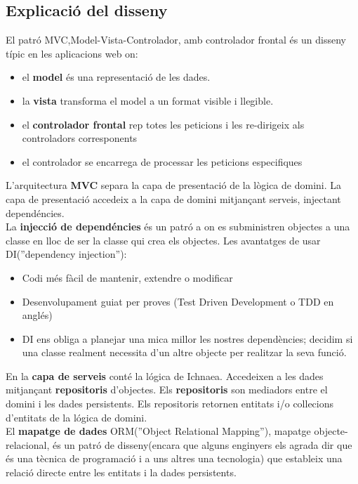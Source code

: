 \subsection{Explicaci\'{o} del disseny}
El patró MVC,Model-Vista-Controlador, amb controlador frontal \'{e}s un disseny t\'{i}pic en les aplicacions web on:
\begin{itemize}
\item el \textbf{model} \'{e}s una representaci\'{o} de les dades.
\item la \textbf{vista} transforma el model a un format visible i llegible.
\item el \textbf{controlador frontal} rep totes les peticions i les re-dirigeix als controladors corresponents
\item el controlador se encarrega de processar les peticions especifiques
\end{itemize}
L'arquitectura \textbf{MVC} separa la capa de presentaci\'{o} de la l\`{o}gica de domini. La capa de presentaci\'{o} accedeix a la capa de domini mitjançant serveis, injectant depend\'{e}ncies. \\
La \textbf{injecci\'{o} de depend\'{e}ncies} \'{e}s un patr\'{o} a on es subministren objectes a una classe en lloc de ser la classe qui crea els objectes.\cite{dependency_injection} Les avantatges de usar DI(''dependency injection''):
\begin{itemize}
\item Codi m\'{e}s f\`{a}cil de mantenir, extendre o modificar
\item Desenvolupament guiat per proves (Test Driven Development o TDD en angl\'{e}s)
\item DI ens obliga a planejar una mica millor les nostres depend\`{e}ncies; decidim si una classe realment necessita d'un altre objecte per realitzar la seva funció.
\end{itemize}

En la \textbf{capa de serveis} cont\'{e} la l\'{o}gica de Ichnaea. Accedeixen a les dades mitjançant \textbf{repositoris} d'objectes. Els \textbf{repositoris} son mediadors entre el domini i les dades persistents. Els repositoris retornen entitats i/o collecions d'entitats de la l\'{ogica} de domini. \\

El \textbf{mapatge de dades} ORM(''Object Relational Mapping''), mapatge objecte-relacional, \'{e}s un patr\'{o} de disseny(encara que alguns enginyers els agrada dir que \'{e}s una tècnica de programaci\'{o} i a uns altres una tecnologia) que estableix una relaci\'{o} directe entre les entitats i la dades persistents.\cite{orm}


